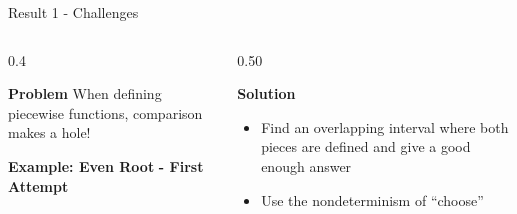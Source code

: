 \begin{frame}{Result 1 - Challenges}
\begin{columns}
    \begin{column}{0.4\linewidth}
        \vspace{-2em}
        \begin{exampleblock}{\color{BrickRed}\textbf{Problem}}
            When defining piecewise functions, comparison makes a hole! 
        \end{exampleblock}
        \pause
        {\textbf{\color{Mahogany}Example: Even Root} \pause \textbf{\color{BrickRed} - First Attempt}\\}
        \vspace{1.5 cm}
        

        \pause
        \begin{flushright}
            \vspace{-3.5em}
            
        \end{flushright}
    \end{column}
    \pause
    \begin{column}{0.50\linewidth}
        \vspace{-2em}
        \begin{exampleblock}{\color{OliveGreen}\textbf{Solution}}
            \begin{itemize}
                \pause \item Find an overlapping interval where both pieces are defined and give a good enough answer
                \pause \item Use the nondeterminism of ``choose''  
            \end{itemize}                       
        \end{exampleblock}  
    \end{column}
\end{columns}
\end{frame}



